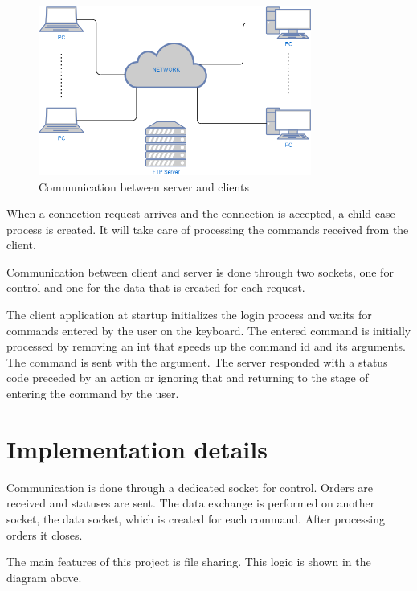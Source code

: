 \documentclass[runningheads]{llncs}
\begin{document}
    \begin{figure}
        \centering
        \includegraphics[width=0.8\textwidth,height=\textheight,keepaspectratio]{comunication}
        \caption{Communication between server and clients}
    \end{figure}

    When a connection request arrives and the connection is accepted, a child case process is created. It will take care of processing the commands received from the client.

    Communication between client and server is done through two sockets, one for control and one for the data that is created for each request.

    The client application at startup initializes the login process and waits for commands entered by the user on the keyboard. The entered command is initially processed by removing an int that speeds up the command id and its arguments. The command is sent with the argument. The server responded with a status code preceded by an action or ignoring that and returning to the stage of entering the command by the user.

\section{Implementation details}

    Communication is done through a dedicated socket for control. Orders are received and statuses are sent. The data exchange is performed on another socket, the data socket, which is created for each command. After processing orders it closes.

    The main features of this project is file sharing. This logic is shown in the diagram above.
\end{document}
